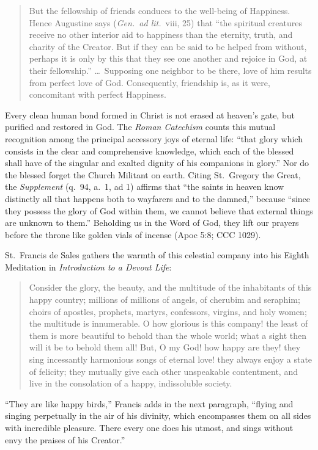 \begin{quote}
But the fellowship of friends conduces to the well-being of Happiness. Hence Augustine says (\textit{Gen.\ ad lit.}\ viii, 25) that ``the spiritual creatures receive no other interior aid to happiness than the eternity, truth, and charity of the Creator. But if they can be said to be helped from without, perhaps it is only by this that they see one another and rejoice in God, at their fellowship.'' \dots\ Supposing one neighbor to be there, love of him results from perfect love of God. Consequently, friendship is, as it were, concomitant with perfect Happiness.
\end{quote}

Every clean human bond formed in Christ is not erased at heaven's gate, but purified and restored in God. The \textit{Roman Catechism} counts this mutual recognition among the principal accessory joys of eternal life: ``that glory which consists in the clear and comprehensive knowledge, which each of the blessed shall have of the singular and exalted dignity of his companions in glory.'' Nor do the blessed forget the Church Militant on earth. Citing St.\ Gregory the Great, the \textit{Supplement} (q.\ 94, a.\ 1, ad 1) affirms that ``the saints in heaven know distinctly all that happens both to wayfarers and to the damned,'' because ``since they possess the glory of God within them, we cannot believe that external things are unknown to them.'' Beholding us in the Word of God, they lift our prayers before the throne like golden vials of incense (Apoc 5:8; CCC 1029).

St.\ Francis de Sales gathers the warmth of this celestial company into his Eighth Meditation in \textit{Introduction to a Devout Life}:

\begin{quote}
Consider the glory, the beauty, and the multitude of the inhabitants of this happy country; millions of millions of angels, of cherubim and seraphim; choirs of apostles, prophets, martyrs, confessors, virgins, and holy women; the multitude is innumerable. O how glorious is this company! the least of them is more beautiful to behold than the whole world; what a sight then will it be to behold them all! But, O my God! how happy are they! they sing incessantly harmonious songs of eternal love! they always enjoy a state of felicity; they mutually give each other unspeakable contentment, and live in the consolation of a happy, indissoluble society.
\end{quote}

``They are like happy birds,'' Francis adds in the next paragraph, ``flying and singing perpetually in the air of his divinity, which encompasses them on all sides with incredible pleasure. There every one does his utmost, and sings without envy the praises of his Creator.''
